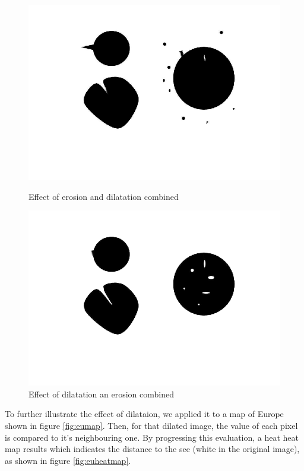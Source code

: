 \begin{figure}[H]
	\centering
	\begin{minipage}[t]{0.4\textwidth}
		\includegraphics[width=\textwidth]{images/images1erodeddilated.png}
		\caption{Effect of erosion and dilatation combined}
		\label{fig:bloodBWerodeddilated}
	\end{minipage}
	\begin{minipage}[t]{0.4\textwidth}
		\includegraphics[width=\textwidth]{images/images1dilatederoded.png}
		\caption{Effect of dilatation an erosion combined}
		\label{fig:images1dilatederoded}
	\end{minipage}
\end{figure}


To further illustrate the effect of dilataion, we applied it to a map of Europe shown in figure \ref{fig:eumap}. Then, for that dilated image, the value of each pixel is compared to it's neighbouring one. By progressing this evaluation, a heat heat map results which indicates  the distance to the see (white in the original image), as shown in figure \ref{fig:euheatmap}.

